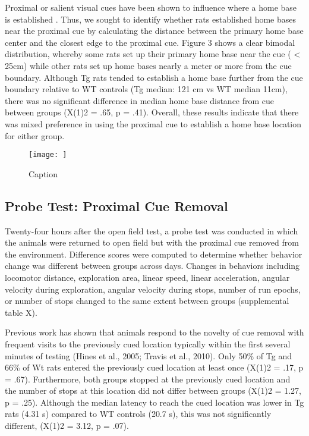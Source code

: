 \documentclass[fleqn,10pt]{wlscirep}
\begin{document}
Proximal or salient visual cues have been shown to influence where a home base is established \cite{nemati_point_2007,hines_home_2005}. Thus, we sought to identify whether rats established home bases near the proximal cue by calculating the distance between the primary home base center and the closest edge to the proximal cue. Figure 3 shows a clear bimodal distribution, whereby some rats set up their primary home base near the cue ( < 25cm) while other rats set up home bases nearly a meter or more from the cue boundary. Although Tg rats tended to establish a home base further from the cue boundary relative to WT controls (Tg median: 121 cm vs WT median 11cm), there was no significant difference in median home base distance from cue between groups  (X(1)2 = .65, p = .41). Overall, these results indicate that there was mixed preference in using the proximal cue to establish a home base location for either group. 

\begin{figure}
    \centering
    \texttt{[image: ]}
    \caption{Caption}
    \label{proximal_cue_fig}
\end{figure}

\subsection*{Probe Test: Proximal Cue Removal}
Twenty-four hours after the open field test, a probe test was conducted in which the animals were returned to open field but with the proximal cue removed from the environment. Difference scores were computed to determine whether behavior change was different between groups across days. Changes in behaviors including locomotor distance, exploration area, linear speed, linear acceleration, angular velocity during exploration, angular velocity during stops, number of run epochs, or number of stops changed to the same extent between groups (supplemental table X). 

Previous work has shown that animals respond to the novelty of cue removal with frequent visits to the previously cued location typically within the first several minutes of testing \cite{hines_home_2005}(Hines et al., 2005; Travis et al., 2010). Only 50\% of Tg and 66\% of Wt rats entered the previously cued location at least once (X(1)2 = .17, p = .67). Furthermore, both groups stopped at the previously cued location and the number of stops at this location did not differ between groups (X(1)2 = 1.27, p = .25). Although the median latency to reach the cued location was lower in Tg rats (4.31 s) compared to WT controls (20.7 s), this was not significantly different, (X(1)2 = 3.12, p = .07). 
\end{document}
